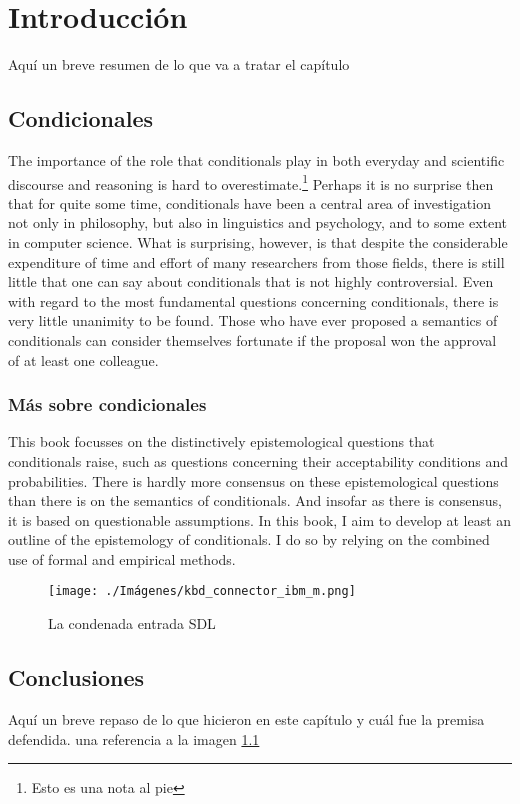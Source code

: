 \chapter{Introducción}
\noindent Aquí un breve resumen de lo que va a tratar el capítulo

\section{Condicionales}

\noindent The importance of the role that conditionals play in both everyday and scientific discourse and reasoning is hard to overestimate.\footnote{Esto es una nota al pie}
Perhaps it is no surprise then that for quite some time, conditionals have been a central area of investigation not only in philosophy, but also in linguistics and psychology, and to some extent in computer science.
What is surprising, however, is that despite the considerable expenditure of time and effort of many researchers from those fields, there is still little that one can say about conditionals that is not highly controversial. 
Even with regard to the most fundamental questions concerning conditionals, there is very little unanimity to be found. \citep{aristotelesnico}
Those who have ever proposed a semantics of conditionals can consider themselves fortunate if the proposal won the approval of at least one colleague. %

\subsection{Más sobre condicionales}

\noindent This book focusses on the distinctively epistemological questions that conditionals raise, such as questions concerning their acceptability conditions and probabilities.
There is hardly more consensus on these epistemological questions than there is on the semantics of conditionals.
And insofar as there is consensus, it is based on questionable assumptions.
In this book, I aim to develop at least an outline of the epistemology of conditionals. 
I do so by relying on the combined use of formal and empirical methods. 


\begin{figure}[h]
    \centering
    \texttt{[image: ./Imágenes/kbd\_connector\_ibm\_m.png]}
    \caption{La condenada entrada SDL}
    \label{fig:sdl1}
\end{figure}

\section*{Conclusiones} %

\noindent Aquí un breve repaso de lo que hicieron en este capítulo y cuál fue la premisa defendida. una referencia a la imagen \ref{fig:sdl1}